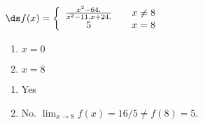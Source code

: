 {$\ds f(x) = \left\{\begin{array}{ccc}
\frac{x^2-64.}{x^2-11. x+24.}		& &  x\neq 8\\
5 & & x=8
\end{array}\right.
$
\begin{enumerate}
\item		$x=0$
\item		$x=8$
\end{enumerate}
}
{\begin{enumerate}
\item		Yes
\item		No. $\lim_{x\to 8} f(x) = 16/5 \neq f(8) = 5$.
\end{enumerate}
}
